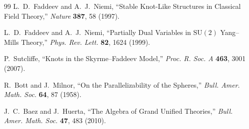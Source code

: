 \documentclass[aps,prl,preprint,superscriptaddress,floatfix]{revtex4-2}
\begin{document}
\begin{thebibliography}{99}
L.~D.~Faddeev and A.~J.~Niemi,
``Stable Knot-Like Structures in Classical Field Theory,''
\textit{Nature} \textbf{387}, 58 (1997).

L.~D.~Faddeev and A.~J.~Niemi,
``Partially Dual Variables in $\mathrm{SU}(2)$ Yang--Mills Theory,''
\textit{Phys. Rev. Lett.} \textbf{82}, 1624 (1999).

P.~Sutcliffe,
``Knots in the Skyrme--Faddeev Model,''
\textit{Proc. R. Soc. A} \textbf{463}, 3001 (2007).

R.~Bott and J.~Milnor,
``On the Parallelizability of the Spheres,''
\textit{Bull. Amer. Math. Soc.} \textbf{64}, 87 (1958).

J.~C.~Baez and J.~Huerta,
``The Algebra of Grand Unified Theories,''
\textit{Bull. Amer. Math. Soc.} \textbf{47}, 483 (2010).

\end{thebibliography}
\end{document}
